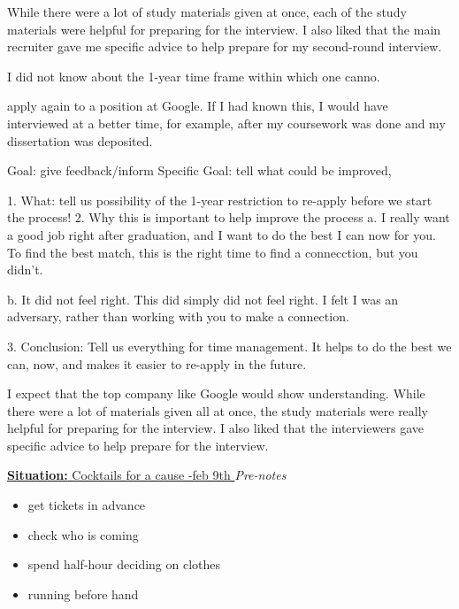 \documentclass[11pt]{article}
\newcommand{\newSituation}[1]{\underline{\textbf{Situation:} #1} }
\begin{document}
{{While there were a lot of study materials given at once, each of the
study materials were helpful for preparing for the interview. I also
liked that the main recruiter gave me specific advice to help prepare
for my second-round interview.

        I did not know about the 1-year time frame within which one
        canno.

        apply again to a position at Google. If I had known this, I
        would have
        interviewed at a better time, for example, after my coursework
        was
        done and my dissertation was deposited.

        Goal: give feedback/inform
        Specific Goal: tell what could be improved,

        1. What: tell us possibility of the 1-year restriction to
        re-apply before we start the process!
        2. Why this is important to help improve the process
          a. I really want a good job right after graduation, and I
          want to do the best I can now for you. To find the best
          match, this is the right time to find a connecction, but
          you didn't.

          b. It did not feel right. This did simply did not feel
          right. I felt I was an adversary,
          rather than working with you to make a connection.

        3. Conclusion: Tell us everything for time management.
        It helps to do the best we can, now, and makes it easier to
        re-apply in the future.

        I expect that the top company like Google would show
        understanding.
        While there were a lot of materials given all at once, the
        study materials were really helpful for preparing for the
        interview. I also liked that the interviewers gave specific
        advice to help prepare for the interview.
}


\newSituation{Cocktails for a cause -feb 9th }
\textit{Pre-notes}
\begin{itemize}
\item get tickets in advance
\item check who is coming
\item spend half-hour deciding on clothes
\item running before hand
\end{itemize}

}
\end{document}
